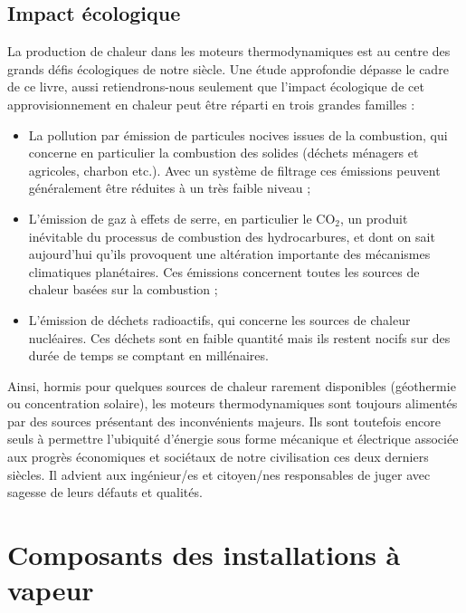
	\subsection{Impact écologique}
	
		La production de chaleur dans les moteurs thermodynamiques est au centre des grands défis écologiques de notre siècle. Une étude approfondie dépasse le cadre de ce livre, aussi retiendrons-nous seulement que l’impact écologique de cet approvisionnement en chaleur peut être réparti en trois grandes familles :
		\begin{itemize}
			\item La pollution par émission de particules nocives issues de la combustion, qui concerne en particulier la combustion des solides (déchets ménagers et agricoles, charbon etc.). Avec un système de filtrage ces émissions peuvent généralement être réduites à un très faible niveau ;
			\item L’émission de gaz à effets de serre, en particulier le $\text{CO}_2$, un produit inévitable du processus de combustion des hydrocarbures, et dont on sait aujourd’hui qu’ils provoquent une altération importante des mécanismes climatiques planétaires. Ces émissions concernent toutes les sources de chaleur basées sur la combustion ;
			\item L’émission de déchets radioactifs, qui concerne les sources de chaleur nucléaires. Ces déchets sont en faible quantité mais ils restent nocifs sur des durée de temps se comptant en millénaires.
		\end{itemize}

		Ainsi, hormis pour quelques sources de chaleur rarement disponibles (géothermie ou concentration solaire), les moteurs thermodynamiques sont toujours alimentés par des sources présentant des inconvénients majeurs. Ils sont toutefois encore seuls à permettre l’ubiquité d’énergie sous forme mécanique et électrique associée aux progrès économiques et sociétaux de notre civilisation ces deux derniers siècles. Il advient aux ingénieur/es et citoyen/nes responsables de juger avec sagesse de leurs défauts et qualités.


\section{Composants des installations à vapeur}

